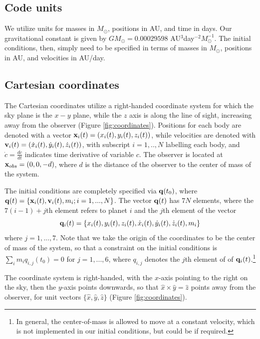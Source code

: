 \documentclass[fleqn,usenatbib,twocolumn]{mnras}
\begin{document}
\subsection{Code units}\label{sec:code_units}

We utilize units for masses in $M_\odot$, positions in AU, and
time in days.   Our gravitational constant is given by
$GM_\odot = 0.00029598$ AU$^3$day$^{-2} M_\odot^{-1}$.  The initial
conditions, then, simply need to be specified in terms of masses
in $M_\odot$, positions in AU, and velocities in
AU/day.

\subsection{Cartesian coordinates} \label{sec:cartesian_coordinates}

The Cartesian coordinates utilize a right-handed coordinate system for which the sky
plane is the $x-y$ plane, while the $z$ axis is along the line of sight,
increasing away from the observer (Figure \ref{fig:coordinates}). Positions for each body are denoted with a
vector ${\bf x}_i(t)=\left(x_i(t),y_i(t),z_i(t)\right)$, while velocities
are denoted with ${\bf v}_i(t)=\left(\dot x_{i}(t),\dot y_{i}(t),\dot
z_{i}(t)\right)$, with subscript $i=1,..,N$ labelling each body, and
$\dot c = \frac{d c}{d t}$ indicates time derivative of
variable $c$.  The observer is located at ${\bf x}_{obs} = \left(0,0,
-d\right)$, where $d$ is the distance of the observer to the center of mass
of the system.

The initial conditions are completely specified via ${\bf q}(t_0)$, where
${\bf q}(t) = \{{\bf x}_i(t),{\bf v}_i(t), m_i; i=1,...,N\}$.  The vector
${\bf q}(t)$ has $7N$ elements, where the $7(i-1)+j$th element refers to planet
$i$ and the $j$th element of the vector
\begin{equation}\label{eqn:coordinates_body}
{\bf q}_i(t) =\{x_i(t),y_i(t),z_i(t),\dot x_i(t),\dot y_i(t), \dot z_i(t), m_i\}
\end{equation}
where $j=1,...,7$.
Note that we take the origin of the coordinates to be the
center of mass of the system, so that a constraint on the initial conditions is
$\sum_i m_i q_{i,j}(t_0) = 0$ for $j=1,...,6$, where $q_{i,j}$ denotes the
$j$th element of of ${\bf q}_i(t)$.\footnote{In general, the center-of-mass is
allowed to move at a constant velocity, which is not implemented in our initial
conditions, but could be if required.}

The coordinate system is right-handed,  with the $x$-axis pointing to the
right on the sky, then the $y$-axis points downwards, so that
$\hat x \times \hat y = \hat z$ points away from the observer, for unit
vectors $\{\hat x, \hat y, \hat z\}$ (Figure \ref{fig:coordinates}).
\end{document}
